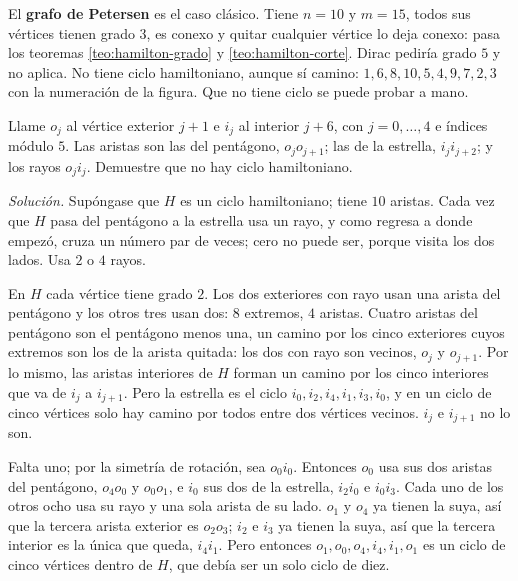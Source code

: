 \documentclass[11pt,letterpaper]{article}
\begin{document}
El \textbf{grafo de Petersen} es el caso clásico. Tiene $n = 10$ y
$m = 15$, todos sus vértices tienen grado $3$, es conexo y quitar
cualquier vértice lo deja conexo: pasa los teoremas
\ref{teo:hamilton-grado} y \ref{teo:hamilton-corte}. Dirac pediría
grado $5$ y no aplica. No tiene ciclo hamiltoniano, aunque sí camino:
$1, 6, 8, 10, 5, 4, 9, 7, 2, 3$ con la numeración de la figura. Que
no tiene ciclo se puede probar a mano.

\begin{ejercicio}
  \label{ej:hamilton-petersen}
  Llame $o_j$ al vértice exterior $j + 1$ e $i_j$ al interior
  $j + 6$, con $j = 0, \dots, 4$ e índices módulo $5$. Las aristas son
  las del pentágono, $o_j o_{j+1}$; las de la estrella,
  $i_j i_{j+2}$; y los rayos $o_j i_j$. Demuestre que no hay ciclo
  hamiltoniano.

  \textit{Solución.} Supóngase que $H$ es un ciclo hamiltoniano; tiene
  $10$ aristas. Cada vez que $H$ pasa del pentágono a la estrella usa
  un rayo, y como regresa a donde empezó, cruza un número par de
  veces; cero no puede ser, porque visita los dos lados. Usa $2$ o
  $4$ rayos.

   En $H$ cada vértice tiene grado $2$. Los dos
  exteriores con rayo usan una arista del pentágono y los otros tres
  usan dos: $8$ extremos, $4$ aristas. Cuatro aristas del pentágono
  son el pentágono menos una, un camino por los cinco exteriores
  cuyos extremos son los de la arista quitada: los dos con rayo son
  vecinos, $o_j$ y $o_{j+1}$. Por lo mismo, las aristas interiores de
  $H$ forman un camino por los cinco interiores que va de $i_j$ a
  $i_{j+1}$. Pero la estrella es el ciclo
  $i_0, i_2, i_4, i_1, i_3, i_0$, y en un ciclo de cinco vértices solo
  hay camino por todos entre dos vértices vecinos. $i_j$ e $i_{j+1}$
  no lo son.

   Falta uno; por la simetría de rotación, sea
  $o_0 i_0$. Entonces $o_0$ usa sus dos aristas del pentágono,
  $o_4 o_0$ y $o_0 o_1$, e $i_0$ sus dos de la estrella, $i_2 i_0$ e
  $i_0 i_3$. Cada uno de los otros ocho usa su rayo y una sola arista
  de su lado. $o_1$ y $o_4$ ya tienen la suya, así que la tercera
  arista exterior es $o_2 o_3$; $i_2$ e $i_3$ ya tienen la suya, así
  que la tercera interior es la única que queda, $i_4 i_1$. Pero
  entonces $o_1, o_0, o_4, i_4, i_1, o_1$ es un ciclo de cinco
  vértices dentro de $H$, que debía ser un solo ciclo de diez.
\end{ejercicio}
\end{document}
